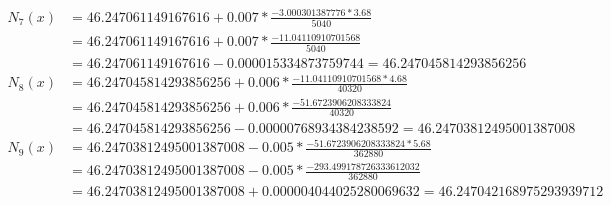 \begin{align*}
    N_7(x) & = 46.247061149167616 + 0.007 * \frac{-3.000301387776 * 3.68}{5040}             \\
           & = 46.247061149167616 + 0.007 * \frac{-11.04110910701568}{5040}                 \\
           & = 46.247061149167616 - 0.000015334873759744 = 46.247045814293856256            \\
    N_8(x) & = 46.247045814293856256 + 0.006 * \frac{-11.04110910701568 * 4.68}{40320}      \\
           & = 46.247045814293856256 + 0.006 * \frac{-51.6723906208333824}{40320}           \\
           & = 46.247045814293856256 - 0.00000768934384238592 = 46.24703812495001387008     \\
    N_9(x) & = 46.24703812495001387008 - 0.005 * \frac{-51.6723906208333824 * 5.68}{362880} \\
           & = 46.24703812495001387008 - 0.005 * \frac{-293.499178726333612032}{362880}     \\
           & = 46.24703812495001387008 + 0.000004044025280069632 = 46.247042168975293939712 \\
\end{align*}
